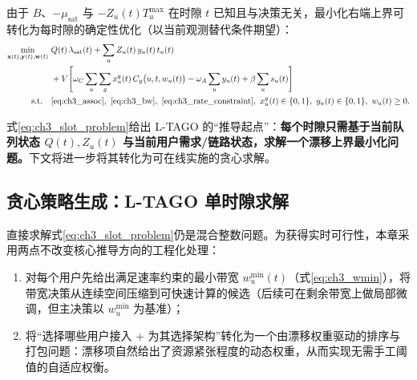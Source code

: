 \documentclass[type=master]{fduthesis}
\begin{document}
由于 $B$、$-\mu_{\mathrm{sat}}$ 与 $-Z_u(t)T_u^{\max}$ 在时隙 $t$ 已知且与决策无关，最小化右端上界可转化为每时隙的确定性优化（以当前观测替代条件期望）：
\begin{align}
\min_{\mathbf{x}(t),\mathbf{y}(t),\mathbf{w}(t)}\ 
& Q(t)\,\lambda_{\mathrm{sat}}(t)
+\sum_{u} Z_u(t)\,y_u(t)\,t_u(t)
\nonumber\\
&+V\Bigg[
\omega_C \sum_{u}\sum_{g}x_u^g(t)\,C_g\big(u,t,w_u(t)\big)
-\omega_A\sum_{u}y_u(t)
+\beta\sum_{u} s_u(t)
\Bigg]
\label{eq:ch3_slot_problem}\\
\text{s.t.}\quad
& \eqref{eq:ch3_assoc},\ \eqref{eq:ch3_bw},\ \eqref{eq:ch3_rate_constraint},\ x_u^g(t)\in\{0,1\},\ y_u(t)\in\{0,1\},\ w_u(t)\ge 0.
\nonumber
\end{align}

式\eqref{eq:ch3_slot_problem}给出 L-TAGO 的“推导起点”：\textbf{每个时隙只需基于当前队列状态 $Q(t),Z_u(t)$ 与当前用户需求/链路状态，求解一个漂移上界最小化问题。}下文将进一步将其转化为可在线实施的贪心求解。

\subsection{贪心策略生成：L-TAGO 单时隙求解}
\label{subsec:ch3_greedy}

直接求解式\eqref{eq:ch3_slot_problem}仍是混合整数问题。为获得实时可行性，本章采用两点不改变核心推导方向的工程化处理：
\begin{enumerate}
  \item 对每个用户先给出满足速率约束的最小带宽 $w_u^{\min}(t)$（式\eqref{eq:ch3_wmin}），将带宽决策从连续空间压缩到可快速计算的候选（后续可在剩余带宽上做局部微调，但主决策以 $w_u^{\min}$ 为基准）；
  \item 将“选择哪些用户接入 + 为其选择架构”转化为一个由漂移权重驱动的排序与打包问题：漂移项自然给出了资源紧张程度的动态权重，从而实现无需手工阈值的自适应权衡。
\end{enumerate}
\end{document}
